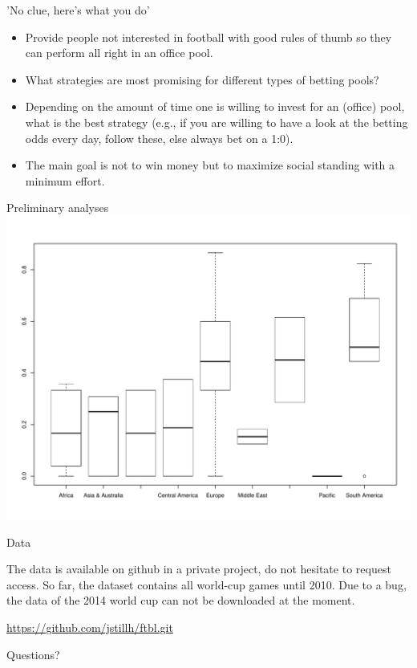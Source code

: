 \documentclass[10pt]{beamer}
\begin{document}
\begin{frame}[fragile]{'No clue, here's what you do'}

\begin{itemize}
\item  Provide people not interested in football with good rules of thumb so they can perform all right in an office pool. 
\item What strategies are most promising for different types of betting pools?
\item Depending on the amount of time one is willing to invest for an (office) pool, what is the best strategy (e.g., if you are willing to have a look at the betting odds every day, follow these, else always bet on a 1:0).
\item The main goal is not to win money but to maximize social standing with a minimum effort. 
\end{itemize}

\end{frame}

\begin{frame}[fragile]{Preliminary analyses}
\includegraphics[scale=0.15]{winpercentage.pdf}
\end{frame}

\begin{frame}[fragile]{Data}

The data is available on github in a private project, do not hesitate to request access.
So far, the dataset contains all world-cup games until 2010. Due to a bug, the data of the 2014 world cup can not be downloaded at the moment.  

\url{https://github.com/jstillh/ftbl.git}
\end{frame}

{
\begin{frame}[standout]
  Questions?
\end{frame}
}


%
%  
%  

\end{document}
